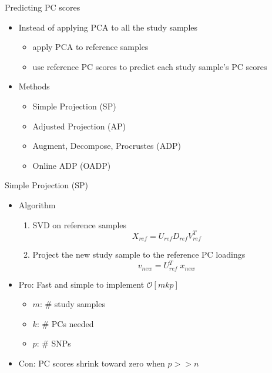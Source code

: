 \documentclass{beamer}
\newcommand{\bO}{\mathcal{O}}
\begin{document}
\begin{frame}{Predicting PC scores}
\begin{itemize}
\item Instead of applying PCA to all the study samples
    \begin{itemize}
    \item apply PCA to reference samples
    \item use reference PC scores to predict each study sample's PC scores
    \end{itemize}
\item Methods
    \begin{itemize}
    \item Simple Projection (SP)
    \item Adjusted Projection (AP)
        \cite{dey2016asymptotic}
    \item Augment, Decompose, Procrustes (ADP) 
        \cite{wang2015improved}
    \item Online ADP (OADP)
        \cite{brand2002incremental}
    \end{itemize}
\end{itemize}
\end{frame}

\begin{frame}{Simple Projection (SP)}
\begin{itemize}
\item Algorithm
    \begin{enumerate}
    \item SVD on reference samples
        \[
            X_{ref} = U_{ref} D_{ref} V_{ref}^T
        \]
    \item Project the new study sample to the reference PC loadings
        \[
           v_{new} = U_{ref}^T \; x_{new}
        \]
    \end{enumerate}
\item Pro: Fast and simple to implement $\bO[mkp]$
    \begin{itemize}
    \item $m$: \# study samples
    \item $k$: \# PCs needed
    \item $p$: \# SNPs 
    \end{itemize}
\item Con: PC scores shrink toward zero when $p >> n$
\end{itemize}
\end{frame}
\end{document}
